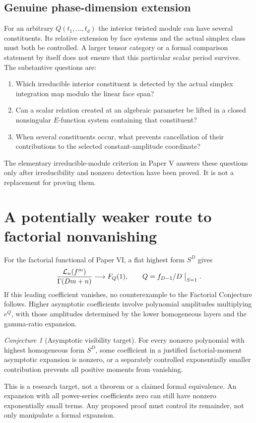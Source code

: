 \documentclass[11pt]{article}
\numberwithin{equation}{section}
\theoremstyle{definition}
\theoremstyle{remark}
\newcommand{\Lcal}{\mathcal L}
\newtheorem{conjecture}[theorem]{Conjecture}
\begin{document}
\subsection{Genuine phase-dimension extension}
For an arbitrary $Q(t_1,\ldots,t_d)$ the interior twisted module can have
several constituents. Its relative extension by face systems and the
actual simplex class must both be controlled. A larger tensor category or
a formal comparison statement by itself does not ensure that this
particular scalar period survives. The substantive questions are:
\begin{enumerate}[leftmargin=2em]
\item Which irreducible interior constituent is detected by the actual
simplex integration map modulo the linear face span?
\item Can a scalar relation created at an algebraic parameter be lifted
in a closed nonsingular $E$-function system containing that constituent?
\item When several constituents occur, what prevents cancellation of their
contributions to the selected constant-amplitude coordinate?
\end{enumerate}
The elementary irreducible-module criterion in Paper V answers these
questions only after irreducibility and nonzero detection have been proved.
It is not a replacement for proving them.

\section{A potentially weaker route to factorial nonvanishing}
For the factorial functional of Paper VI, a flat highest form $S^D$ gives
\[
 \frac{\Lcal_n(f^m)}{\Gamma(Dm+n)}\longrightarrow F_Q(1),
 \qquad Q=f_{D-1}/D\bigm|_{S=1}.
\]
If this leading coefficient vanishes, no counterexample to the Factorial
Conjecture follows. Higher asymptotic coefficients involve polynomial
amplitudes multiplying $e^Q$, with those amplitudes determined by the
lower homogeneous layers and the gamma-ratio expansion.

\begin{conjecture}[Asymptotic visibility target]\label{conj:visibility}
For every nonzero polynomial with highest homogeneous form $S^D$, some
coefficient in a justified factorial-moment asymptotic expansion is
nonzero, or a separately controlled exponentially smaller contribution
prevents all positive moments from vanishing.
\end{conjecture}
This is a research target, not a theorem or a claimed formal equivalence.
An expansion with all power-series coefficients zero can still have
nonzero exponentially small terms. Any proposed proof must control its
remainder, not only manipulate a formal expansion.
\end{document}
